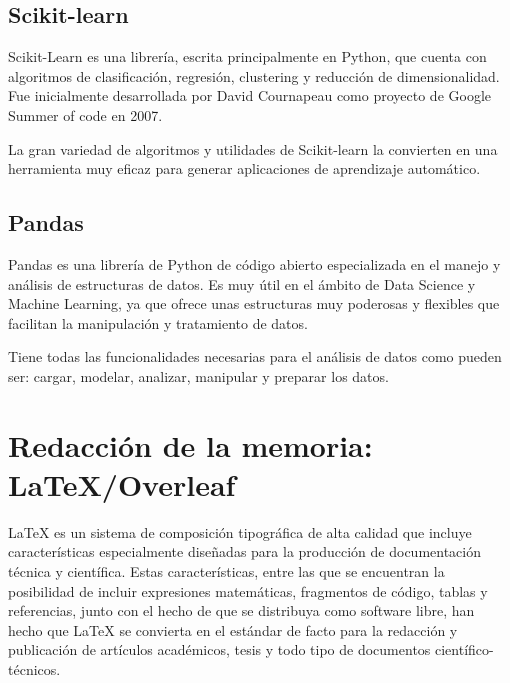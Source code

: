 \documentclass[a4paper, 12pt]{book}
\begin{document}
\subsection{Scikit-learn}
\label{subsec:Scikit-learn}
Scikit-Learn es una librería, escrita principalmente en Python, que cuenta con algoritmos de clasificación, regresión, clustering y reducción de dimensionalidad. Fue inicialmente desarrollada por David Cournapeau como proyecto de Google Summer of code en 2007.

La gran variedad de algoritmos y utilidades de Scikit-learn la convierten en una herramienta muy eficaz para generar aplicaciones de aprendizaje automático.

\subsection{Pandas}
\label{subsec:Pandas}

Pandas es una librería de Python de código abierto especializada en el manejo y análisis de estructuras de datos. Es muy útil en el ámbito de Data Science y Machine Learning, ya que ofrece unas estructuras muy poderosas y flexibles que facilitan la manipulación y tratamiento de datos.

Tiene todas las funcionalidades necesarias para el análisis de datos como pueden ser: cargar, modelar, analizar, manipular y preparar los datos.

\section{Redacción de la memoria: LaTeX/Overleaf}
\label{sec:redaccion_de_la_memoria}

LaTeX es un sistema de composición tipográfica de alta calidad que incluye características especialmente diseñadas para la producción de documentación técnica y científica. Estas características, entre las que se encuentran la posibilidad de incluir expresiones matemáticas, fragmentos de código, tablas y referencias, junto con el hecho de que se distribuya como software libre, han hecho que LaTeX se convierta en el estándar de facto para la redacción y publicación de artículos académicos, tesis y todo tipo de documentos científico-técnicos. 
\end{document}
